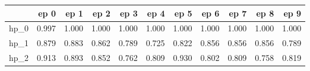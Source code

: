 \begin{tabular}{lrrrrrrrrrr}
\toprule
{} &   ep 0 &   ep 1 &   ep 2 &   ep 3 &   ep 4 &   ep 5 &   ep 6 &   ep 7 &   ep 8 &   ep 9 \\
\midrule
hp\_0 &  0.997 &  1.000 &  1.000 &  1.000 &  1.000 &  1.000 &  1.000 &  1.000 &  1.000 &  1.000 \\
hp\_1 &  0.879 &  0.883 &  0.862 &  0.789 &  0.725 &  0.822 &  0.856 &  0.856 &  0.856 &  0.789 \\
hp\_2 &  0.913 &  0.893 &  0.852 &  0.762 &  0.809 &  0.930 &  0.802 &  0.809 &  0.758 &  0.819 \\
\bottomrule
\end{tabular}
